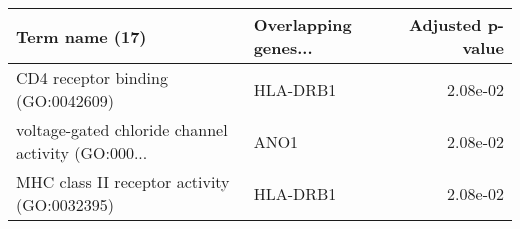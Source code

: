 \begin{tabular}{llr}
\toprule
                                    Term name (17) & Overlapping genes... &  Adjusted p-value \\
\midrule
                 CD4 receptor binding (GO:0042609) &             HLA-DRB1 &          2.08e-02 \\
voltage-gated chloride channel activity (GO:000... &                 ANO1 &          2.08e-02 \\
       MHC class II receptor activity (GO:0032395) &             HLA-DRB1 &          2.08e-02 \\
\bottomrule
\end{tabular}
